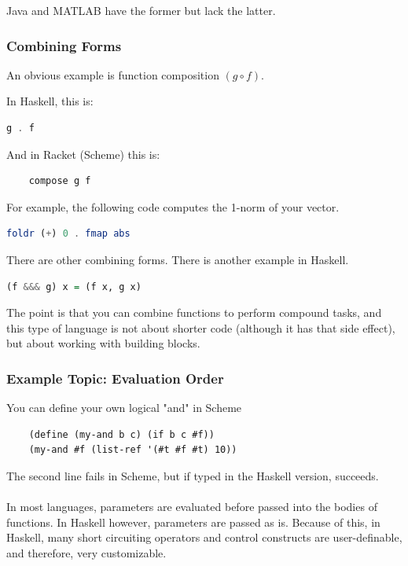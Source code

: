 \documentclass[12pt]{article}
\begin{document}
Java and MATLAB have the former but lack the latter.

\subsubsection{Combining Forms}

An obvious example is function composition $(g \circ f)$.

In Haskell, this is:
\begin{lstlisting}[language=Haskell]
    g . f
\end{lstlisting}

And in Racket (Scheme) this is:
\begin{lstlisting}
    compose g f
\end{lstlisting}

For example, the following code computes the 1-norm of your vector.

\begin{lstlisting}[language=Haskell]
    foldr (+) 0 . fmap abs
\end{lstlisting}

There are other combining forms. There is another example in Haskell.

\begin{lstlisting}[language=Haskell]
    (f &&& g) x = (f x, g x)
\end{lstlisting}

The point is that you can combine functions to perform compound tasks, and this type of language is not about shorter code (although it has that side effect), but about working with building blocks.

\subsubsection{Example Topic: Evaluation Order}

You can define your own logical "and" in Scheme

\begin{lstlisting}
    (define (my-and b c) (if b c #f))
    (my-and #f (list-ref '(#t #f #t) 10))
\end{lstlisting}

The second line fails in Scheme, but if typed in the Haskell version, succeeds.\\
\\
In most languages, parameters are evaluated before passed into the bodies of functions. In Haskell however, parameters are passed as is. Because of this, in Haskell, many short circuiting operators and control constructs are user-definable, and therefore, very customizable.
\end{document}
